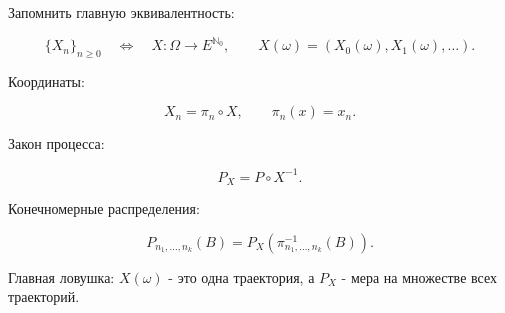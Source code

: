 \documentclass[
  11pt,
  a4paper,
]{article}
\begin{document}
Запомнить главную эквивалентность:

\[
\{X_n\}_{n\ge0}
\quad\Longleftrightarrow\quad
X:\Omega\to E^{\mathbb N_0},
\qquad
X(\omega)=(X_0(\omega),X_1(\omega),\ldots).
\]

Координаты:

\[
X_n=\pi_n\circ X,
\qquad
\pi_n(x)=x_n.
\]

Закон процесса:

\[
P_X=P\circ X^{-1}.
\]

Конечномерные распределения:

\[
P_{n_1,\ldots,n_k}(B)
=
P_X(\pi_{n_1,\ldots,n_k}^{-1}(B)).
\]

Главная ловушка: \(X(\omega)\) - это одна траектория, а \(P_X\) - мера
на множестве всех траекторий.

\newpage
\end{document}

